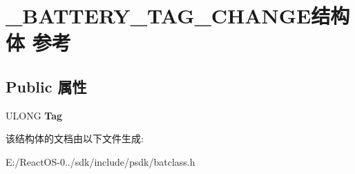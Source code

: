 \hypertarget{struct___b_a_t_t_e_r_y___t_a_g___c_h_a_n_g_e}{}\section{\+\_\+\+B\+A\+T\+T\+E\+R\+Y\+\_\+\+T\+A\+G\+\_\+\+C\+H\+A\+N\+G\+E结构体 参考}
\label{struct___b_a_t_t_e_r_y___t_a_g___c_h_a_n_g_e}
\subsection*{Public 属性}
\begin{DoxyCompactItemize}
\item 
\mbox{\label{struct___b_a_t_t_e_r_y___t_a_g___c_h_a_n_g_e_a973d9bcd1d0bc71b2ea5f5b0ed83abb4}} 
U\+L\+O\+NG {\bfseries Tag}
\end{DoxyCompactItemize}


该结构体的文档由以下文件生成\+:\begin{DoxyCompactItemize}
\item 
E\+:/\+React\+O\+S-\/0../sdk/include/psdk/batclass.\+h\end{DoxyCompactItemize}
